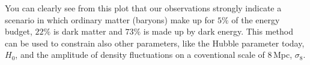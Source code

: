 You can clearly see from this plot that our observations strongly indicate a scenario in which ordinary matter (baryons) make up for $5\%$ of the energy budget, $22\%$ is dark matter and $73\%$ is made up by dark energy. This method can be used to constrain also other parameters, like the Hubble parameter today, $H_0$, and the amplitude of density fluctuations on a coventional scale of 8\,Mpc, $\sigma_8$.